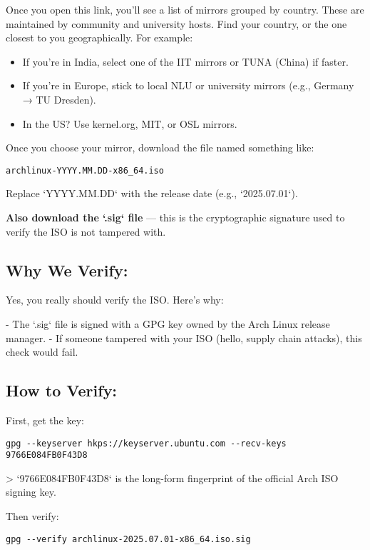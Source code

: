 \documentclass[12pt]{book}
\begin{document}
Once you open this link, you’ll see a list of mirrors grouped by country. These are maintained by community and university hosts. Find your country, or the one closest to you geographically. For example:

\begin{itemize}
  \item If you're in India, select one of the IIT mirrors or TUNA (China) if faster.
  \item If you're in Europe, stick to local NLU or university mirrors (e.g., Germany → TU Dresden).
  \item In the US? Use kernel.org, MIT, or OSL mirrors.
\end{itemize}

Once you choose your mirror, download the file named something like:

\begin{lstlisting}
archlinux-YYYY.MM.DD-x86_64.iso
\end{lstlisting}

Replace `YYYY.MM.DD` with the release date (e.g., `2025.07.01`).

\textbf{Also download the `.sig` file} — this is the cryptographic signature used to verify the ISO is not tampered with.

\subsection*{Why We Verify:}

Yes, you really should verify the ISO. Here's why:

- The `.sig` file is signed with a GPG key owned by the Arch Linux release manager.
- If someone tampered with your ISO (hello, supply chain attacks), this check would fail.

\subsection*{How to Verify:}

First, get the key:
\begin{lstlisting}
gpg --keyserver hkps://keyserver.ubuntu.com --recv-keys 9766E084FB0F43D8
\end{lstlisting}

> `9766E084FB0F43D8` is the long-form fingerprint of the official Arch ISO signing key.

Then verify:
\begin{lstlisting}
gpg --verify archlinux-2025.07.01-x86_64.iso.sig
\end{lstlisting}
\end{document}
